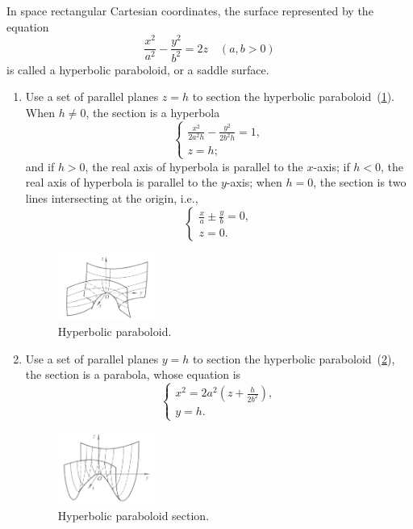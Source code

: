\documentclass[11pt]{../../TexTemplate/elegantbook} %
\begin{document}
\vspace{0.7cm}
In space rectangular Cartesian coordinates, 
the surface represented by the equation
\[
\frac{x^{2}}{a^{2}} - \frac{y^{2}}{b^{2}} = 2z\quad (a,b > 0)
\]
is called a hyperbolic paraboloid, or a saddle surface.
\begin{enumerate}
    \item Use a set of parallel planes \(z=h\) to section the hyperbolic paraboloid~(\ref{fig:HyperbolicParaboloid1}).
        When \(h\neq 0\), the section is a hyperbola
        \[
        \begin{cases} \frac{x^{2}}{2a^{2}h} - \frac{y^{2}}{2b^{2}h} = 1, \\ z=h; \end{cases}
        \]
        and if \(h>0\), the real axis of hyperbola is parallel to the \(x\)-axis;
        if \(h<0\), the real axis of hyperbola is parallel to the \(y\)-axis;\newline
        when \(h=0\), the section is two lines intersecting at the origin, i.e.,
        \[
        \begin{cases} \frac{x}{a}\pm \frac{y}{b} = 0, \\ z=0. \end{cases}
        \]
        \begin{figure}[h]
            \centering
            \includegraphics[width=0.3\textwidth]{img/hyperbolic-paraboloid1.png}
            \caption{Hyperbolic paraboloid.}
            \label{fig:HyperbolicParaboloid1}
        \end{figure} 
    \item Use a set of parallel planes \(y=h\) to section the hyperbolic paraboloid~(\ref{fig:HyperbolicParaboloid2}),
        the section is a parabola, whose equation is
        \[
        \begin{cases} x^{2} = 2a^{2}(z+\frac{h}{2b^{2}}), \\ y=h. \end{cases}
        \]
        \begin{figure}[h]
            \centering
            \includegraphics[width=0.3\textwidth]{img/hyperbolic-paraboloid2.png}
            \caption{Hyperbolic paraboloid section.}
            \label{fig:HyperbolicParaboloid2}
        \end{figure}
\end{enumerate}
\end{document}
